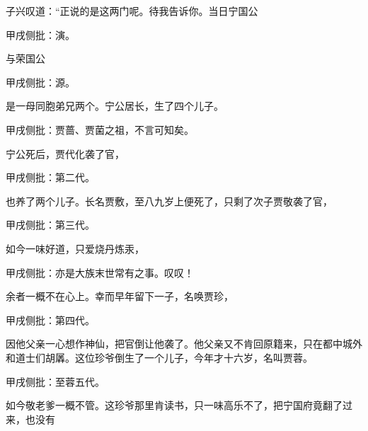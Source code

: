 \begin{parag}
    子兴叹道：“正说的是这两门呢。待我告诉你。当日宁国公\begin{note}甲戌侧批：演。\end{note}与荣国公\begin{note}甲戌侧批：源。\end{note}是一母同胞弟兄两个。宁公居长，生了四个儿子。\begin{note}甲戌侧批：贾蔷、贾菌之祖，不言可知矣。\end{note}宁公死后，贾代化袭了官，\begin{note}甲戌侧批：第二代。\end{note}也养了两个儿子。长名贾敷，至八九岁上便死了，只剩了次子贾敬袭了官，\begin{note}甲戌侧批：第三代。\end{note}如今一味好道，只爱烧丹炼汞，\begin{note}甲戌侧批：亦是大族末世常有之事。叹叹！\end{note}余者一概不在心上。幸而早年留下一子，名唤贾珍，\begin{note}甲戌侧批：第四代。\end{note}因他父亲一心想作神仙，把官倒让他袭了。他父亲又不肯回原籍来，只在都中城外和道士们胡羼。这位珍爷倒生了一个儿子，今年才十六岁，名叫贾蓉。\begin{note}甲戌侧批：至蓉五代。\end{note}如今敬老爹一概不管。这珍爷那里肯读书，只一味高乐不了，把宁国府竟翻了过来，也没有
\end{parag}
